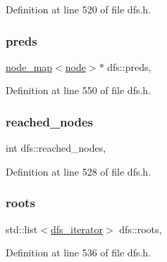 Definition at line 520 of file dfs.\+h.

\mbox{\label{classdfs_a3fdeb5a211a1bc1753b2a637258c5355}} 
\subsubsection{\texorpdfstring{preds}{preds}}
{\footnotesize\ttfamily \mbox{\hyperlink{classnode__map}{node\+\_\+map}}$<$\mbox{\hyperlink{classnode}{node}}$>$$\ast$ dfs\+::preds\hspace{0.3cm}{\ttfamily [protected]}, {\ttfamily [inherited]}}



Definition at line 550 of file dfs.\+h.

\mbox{\label{classdfs_acb11186a1a2a2a1f38cdc0674340ba37}} 
\subsubsection{\texorpdfstring{reached\+\_\+nodes}{reached\_nodes}}
{\footnotesize\ttfamily int dfs\+::reached\+\_\+nodes\hspace{0.3cm}{\ttfamily [protected]}, {\ttfamily [inherited]}}



Definition at line 528 of file dfs.\+h.

\mbox{\label{classdfs_a0bbd5cb8df26c891b74dadd84b46a06b}} 
\subsubsection{\texorpdfstring{roots}{roots}}
{\footnotesize\ttfamily std\+::list$<$\mbox{\hyperlink{classdfs_a15fe023a5a1f7ddda00f3d87110d9a32}{dfs\+\_\+iterator}}$>$ dfs\+::roots\hspace{0.3cm}{\ttfamily [protected]}, {\ttfamily [inherited]}}



Definition at line 536 of file dfs.\+h.

\mbox{\label{classdfs_af677cfc31fe06a18dd3a3aae7f7d112b}} 
